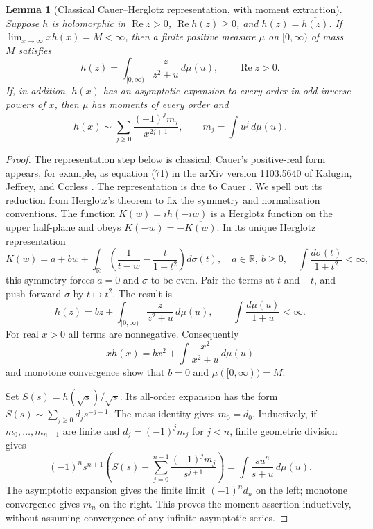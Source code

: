 \documentclass[11pt,a4paper]{article}
\newtheorem{lemma}[theorem]{Lemma}
\theoremstyle{definition}
\theoremstyle{remark}
\numberwithin{equation}{section}
\begin{document}
\begin{lemma}[Classical Cauer--Herglotz representation, with moment extraction]
\label{lc:positive-real}
Suppose $h$ is holomorphic in $\operatorname{Re}z>0$,
$\operatorname{Re}h(z)\ge0$, and
$h(\overline z)=\overline{h(z)}$.
If $\lim_{x\to\infty}xh(x)=M<\infty$, then a finite positive measure
$\mu$ on $[0,\infty)$ of mass $M$ satisfies
\[
 h(z)=\int_{[0,\infty)}\frac{z}{z^2+u}\,d\mu(u),
 \qquad \operatorname{Re}z>0.
\]
If, in addition, $h(x)$ has an asymptotic expansion to every order in
odd inverse powers of $x$, then $\mu$ has moments of every order and
\[
 h(x)\sim\sum_{j\ge0}\frac{(-1)^jm_j}{x^{2j+1}},
 \qquad m_j=\int u^j\,d\mu(u).
\]
\end{lemma}
\begin{proof}
The representation step below is classical; Cauer's positive-real
form appears, for example, as equation (71) in the arXiv version
1103.5640 of Kalugin, Jeffrey, and Corless \cite{Kalugin2011}.
The representation is due to Cauer \cite{Cauer1932}. We spell out its reduction from Herglotz's
theorem to fix the symmetry and normalization conventions.
The function $K(w)=ih(-iw)$ is a Herglotz function on the upper
half-plane and obeys $K(-\overline w)=-\overline{K(w)}$.
In its unique Herglotz representation
\[
 K(w)=a+bw+\int_{\mathbb R}
 \left(\frac1{t-w}-\frac{t}{1+t^2}\right)d\sigma(t),
 \quad a\in\mathbb R,\ b\ge0,\quad
 \int\frac{d\sigma(t)}{1+t^2}<\infty,
\]
this symmetry forces $a=0$ and $\sigma$ to be even. Pair the terms
at $t$ and $-t$, and push forward $\sigma$ by $t\mapsto t^2$.
The result is
\[
 h(z)=bz+\int_{[0,\infty)}\frac{z}{z^2+u}\,d\mu(u),
 \qquad \int\frac{d\mu(u)}{1+u}<\infty.
\]
For real $x>0$ all terms are nonnegative. Consequently
\[
 xh(x)=bx^2+\int\frac{x^2}{x^2+u}\,d\mu(u)
\]
and monotone convergence show that $b=0$ and $\mu([0,\infty))=M$.

Set $S(s)=h(\sqrt s)/\sqrt s$. Its all-order expansion has the form
$S(s)\sim\sum_{j\ge0}d_js^{-j-1}$. The mass identity gives $m_0=d_0$.
Inductively, if $m_0,\ldots,m_{n-1}$ are finite and
$d_j=(-1)^jm_j$ for $j<n$, finite geometric division gives
\[
 (-1)^ns^{n+1}\left(S(s)-
       \sum_{j=0}^{n-1}\frac{(-1)^jm_j}{s^{j+1}}\right)
   =\int\frac{s u^n}{s+u}\,d\mu(u).
\]
The asymptotic expansion gives the finite limit $(-1)^nd_n$ on the
left; monotone convergence gives $m_n$ on the right. This proves
the moment assertion inductively, without assuming convergence of
any infinite asymptotic series.
\end{proof}
\end{document}
